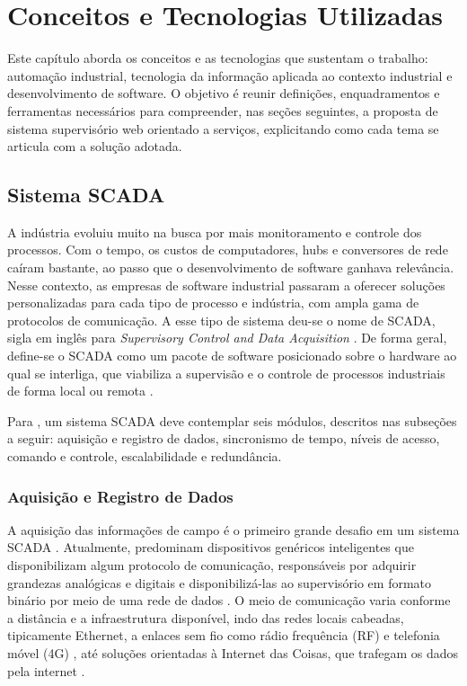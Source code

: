 \newpage
\section{Conceitos e Tecnologias Utilizadas}

\par Este capítulo aborda os conceitos e as tecnologias que sustentam o trabalho: automação industrial, tecnologia da informação aplicada ao contexto industrial e desenvolvimento de software. O objetivo é reunir definições, enquadramentos e ferramentas necessários para compreender, nas seções seguintes, a proposta de sistema supervisório web orientado a serviços, explicitando como cada tema se articula com a solução adotada.

\subsection{Sistema SCADA}

\par A indústria evoluiu muito na busca por mais monitoramento e controle dos processos. Com o tempo, os custos de computadores, hubs e conversores de rede caíram bastante, ao passo que o desenvolvimento de software ganhava relevância. Nesse contexto, as empresas de software industrial passaram a oferecer soluções personalizadas para cada tipo de processo e indústria, com ampla gama de protocolos de comunicação. A esse tipo de sistema deu-se o nome de SCADA, sigla em inglês para \emph{Supervisory Control and Data Acquisition} \cite{ZANGHI2019_SCADA_CONCEITOS}. De forma geral, define-se o SCADA como um pacote de software posicionado sobre o hardware ao qual se interliga, que viabiliza a supervisão e o controle de processos industriais de forma local ou remota \cite{PHUYAL2020_COST_EFFICIENT_SCADA, AHMED2011_EFFICIENT_WEB_SCADA}.

\par Para \textcite{ZANGHI2019_SCADA_CONCEITOS}, um sistema SCADA deve contemplar seis módulos, descritos nas subseções a seguir: aquisição e registro de dados, sincronismo de tempo, níveis de acesso, comando e controle, escalabilidade e redundância.

\subsubsection{Aquisição e Registro de Dados}

\par A aquisição das informações de campo é o primeiro grande desafio em um sistema SCADA \cite{ZANGHI2019_SCADA_CONCEITOS}. Atualmente, predominam dispositivos genéricos inteligentes que disponibilizam algum protocolo de comunicação, responsáveis por adquirir grandezas analógicas e digitais e disponibilizá-las ao supervisório em formato binário por meio de uma rede de dados \cite{YADAV2020_SCADA_ARCHITECTURE_REVIEW}. O meio de comunicação varia conforme a distância e a infraestrutura disponível, indo das redes locais cabeadas, tipicamente Ethernet, a enlaces sem fio como rádio frequência (RF) e telefonia móvel (4G) \cite{STOUFFER2015_NIST_ICS_SECURITY}, até soluções orientadas à Internet das Coisas, que trafegam os dados pela internet \cite{KHALID2024_IOT_SCADA_PHOTOVOLTAIC}.

